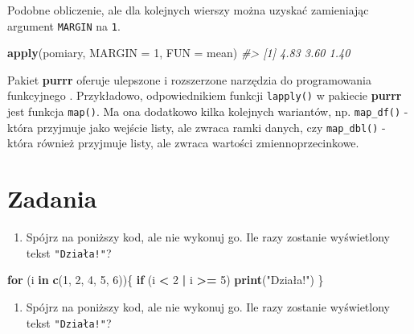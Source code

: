 \documentclass[paper=6in:9in,pagesize=pdftex,headinclude=on,footinclude=on,10pt]{scrbook}
\newenvironment{Shaded}{\begin{snugshade}}{\end{snugshade}}
\newcommand{\CommentTok}[1]{\textcolor[rgb]{0.56,0.35,0.01}{\textit{#1}}}
\newcommand{\ControlFlowTok}[1]{\textcolor[rgb]{0.13,0.29,0.53}{\textbf{#1}}}
\newcommand{\DataTypeTok}[1]{\textcolor[rgb]{0.13,0.29,0.53}{#1}}
\newcommand{\DecValTok}[1]{\textcolor[rgb]{0.00,0.00,0.81}{#1}}
\newcommand{\KeywordTok}[1]{\textcolor[rgb]{0.13,0.29,0.53}{\textbf{#1}}}
\newcommand{\NormalTok}[1]{#1}
\newcommand{\OperatorTok}[1]{\textcolor[rgb]{0.81,0.36,0.00}{\textbf{#1}}}
\newcommand{\StringTok}[1]{\textcolor[rgb]{0.31,0.60,0.02}{#1}}
\providecommand{\tightlist}{%
  \setlength{\itemsep}{0pt}\setlength{\parskip}{0pt}}
\let\BeginKnitrBlock\begin \let\EndKnitrBlock\end
\begin{document}
Podobne obliczenie, ale dla kolejnych wierszy można uzyskać zamieniając argument \texttt{MARGIN} na \texttt{1}.

\begin{Shaded}
\begin{Highlighting}[]
\KeywordTok{apply}\NormalTok{(pomiary, }\DataTypeTok{MARGIN =} \DecValTok{1}\NormalTok{, }\DataTypeTok{FUN =}\NormalTok{ mean)}
\CommentTok{#> [1] 4.83 3.60 1.40}
\end{Highlighting}
\end{Shaded}

\BeginKnitrBlock{rmdinfo}
Pakiet \textbf{purrr} oferuje ulepszone i rozszerzone narzędzia do programowania funkcyjnego \citep{R-purrr}.
Przykładowo, odpowiednikiem funkcji \texttt{lapply()} w pakiecie \textbf{purrr} jest funkcja \texttt{map()}.
Ma ona dodatkowo kilka kolejnych wariantów, np. \texttt{map\_df()} - która przyjmuje jako wejście listy, ale zwraca ramki danych, czy \texttt{map\_dbl()} - która również przyjmuje listy, ale zwraca wartości zmiennoprzecinkowe.
\EndKnitrBlock{rmdinfo}

\hypertarget{zadania-7}{%
\section{Zadania}\label{zadania-7}}

\begin{enumerate}
\def\labelenumi{\arabic{enumi})}
\tightlist
\item
  Spójrz na poniższy kod, ale nie wykonuj go.
  Ile razy zostanie wyświetlony tekst \texttt{"Działa!"}?
\end{enumerate}

\begin{Shaded}
\begin{Highlighting}[]
\ControlFlowTok{for}\NormalTok{ (i }\ControlFlowTok{in} \KeywordTok{c}\NormalTok{(}\DecValTok{1}\NormalTok{, }\DecValTok{2}\NormalTok{, }\DecValTok{4}\NormalTok{, }\DecValTok{5}\NormalTok{, }\DecValTok{6}\NormalTok{))\{}
    \ControlFlowTok{if}\NormalTok{ (i }\OperatorTok{<}\StringTok{ }\DecValTok{2} \OperatorTok{|}\StringTok{ }\NormalTok{i }\OperatorTok{>=}\StringTok{ }\DecValTok{5}\NormalTok{)}
      \KeywordTok{print}\NormalTok{(}\StringTok{"Działa!"}\NormalTok{)}
\NormalTok{\}}
\end{Highlighting}
\end{Shaded}

\begin{enumerate}
\def\labelenumi{\arabic{enumi})}
\setcounter{enumi}{1}
\tightlist
\item
  Spójrz na poniższy kod, ale nie wykonuj go.
  Ile razy zostanie wyświetlony tekst \texttt{"Działa!"}?
\end{enumerate}
\end{document}
